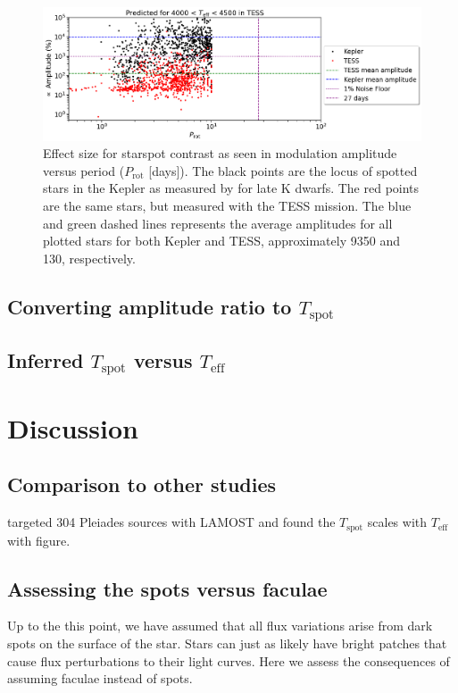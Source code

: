 \documentclass[modern]{aastex631}
\begin{document}
  \begin{figure}[!htb]
    \centering
    \includegraphics[scale=0.42]{Amplitude vs. Rotation for Kepler and TESS.png}
    \caption{Effect size for starspot contrast as seen in modulation amplitude versus period ($P_{\mathrm{rot}}$ [days]). The black points are the locus of spotted stars in the Kepler as measured by for late K dwarfs. The red points are the same stars, but measured with the TESS mission. The blue and green dashed lines represents the average amplitudes for all plotted stars for both Kepler and TESS, approximately 9350 and 130, respectively.}
  \end{figure}
  \FloatBarrier

\subsection{Converting amplitude ratio to $T_{\mathrm{spot}}$}

\subsection{Inferred $T_{\mathrm{spot}}$ versus $T_{\mathrm{eff}}$}


\section{Discussion}

\subsection{Comparison to other studies}
\citet{2016MNRAS.463.2494F} targeted 304 Pleiades sources with LAMOST and found the $T_{\mathrm{spot}}$ scales with $T_{\mathrm{eff}}$ with figure.

\subsection{Assessing the spots versus faculae}
Up to the this point, we have assumed that all flux variations arise from dark spots on the surface of the star. Stars can just as likely have bright patches that cause flux perturbations to their light curves. Here we assess the consequences of assuming faculae instead of spots.
\end{document}
